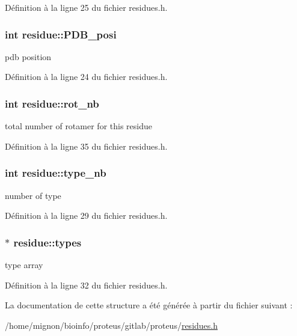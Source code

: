 Définition à la ligne 25 du fichier residues.\+h.

\hypertarget{structresidue_afa720c250e605c3ae15eaca9a424eca1}{
\subsubsection[{P\+D\+B\+\_\+posi}]{\setlength{\rightskip}{0pt plus 5cm}int residue\+::\+P\+D\+B\+\_\+posi}}\label{structresidue_afa720c250e605c3ae15eaca9a424eca1}


pdb position 



Définition à la ligne 24 du fichier residues.\+h.

\hypertarget{structresidue_add24ab42da2ac2437a1f177267ae1866}{
\subsubsection[{rot\+\_\+nb}]{\setlength{\rightskip}{0pt plus 5cm}int residue\+::rot\+\_\+nb}}\label{structresidue_add24ab42da2ac2437a1f177267ae1866}


total number of rotamer for this residue 



Définition à la ligne 35 du fichier residues.\+h.

\hypertarget{structresidue_abb7672d7abb08b7ad044fccd7964fcca}{
\subsubsection[{type\+\_\+nb}]{\setlength{\rightskip}{0pt plus 5cm}int residue\+::type\+\_\+nb}}\label{structresidue_abb7672d7abb08b7ad044fccd7964fcca}


number of type 



Définition à la ligne 29 du fichier residues.\+h.

\hypertarget{structresidue_af53f6e2a6a5994935bada9ce0bcdbc82}{
\subsubsection[{types}]{$\ast$ residue\+::types}}\label{structresidue_af53f6e2a6a5994935bada9ce0bcdbc82}


type array 



Définition à la ligne 32 du fichier residues.\+h.



La documentation de cette structure a été générée à partir du fichier suivant \+:\begin{DoxyCompactItemize}
\item 
/home/mignon/bioinfo/proteus/gitlab/proteus/\hyperlink{residues_8h}{residues.\+h}\end{DoxyCompactItemize}
